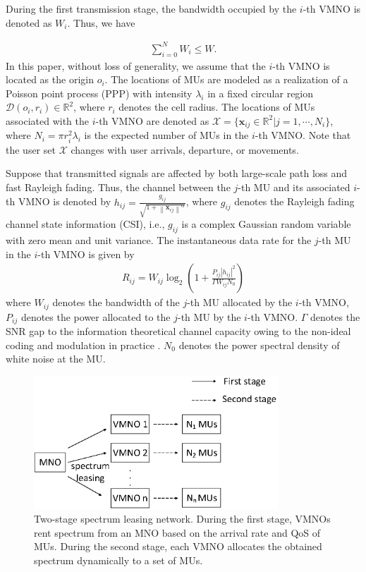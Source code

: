 \documentclass[journal]{IEEEtran}
\begin{document}
During the first transmission stage, the bandwidth occupied by the $i$-th VMNO is denoted as $W_i$. Thus, we have

\begin{align}
\sum_{i = 0}^{N} W_i \leq W.
\end{align}
In this paper, without loss of generality, we assume that the $i$-th VMNO is located as the origin $o_i$. The locations of MUs are modeled as a realization of a Poisson point process (PPP) with intensity $\lambda_i$ in a fixed circular region $\mathcal{D}(o_i, r_i) \in \mathbb{R}^2$, where $r_i$ denotes the cell radius. The locations of MUs associated with the $i$-th VMNO are denoted as $\mathcal{X} = \{\mathbf{x}_{ij} \in \mathbb{R}^2 | j = 1, \cdots, N_i\}$, where $N_i = \pi r_i^2 \lambda_i$ is the expected number of MUs in the $i$-th VMNO. Note that the user set $\mathcal{X}$ changes with user arrivals, departure, or movements.

Suppose that transmitted signals are affected by both large-scale path loss and fast Rayleigh fading. Thus, the channel between the $j$-th MU and its associated $i$-th VMNO is denoted by $h_{ij} = \frac{g_{ij}}{\sqrt{1 + {\left\| \mathbf{x}_{ij} \right\|}^\alpha}}$, where $g_{ij}$ denotes the Rayleigh fading channel state information (CSI), i.e., $g_{ij}$ is a complex Gaussian random variable with zero mean and unit variance. The instantaneous data rate for the $j$-th MU in the $i$-th VMNO is given by
\begin{align}
	R_{ij} = W_{ij}\log_2\left(1 + \frac{P_{ij} \left|h_{ij} \right|^2 }{\Gamma W_{ij}N_0}\right)
\end{align}
where $W_{ij}$ denotes the bandwidth of the $j$-th MU allocated by the $i$-th VMNO, $P_{ij}$ denotes the power allocated to the $j$-th MU by the $i$-th VMNO. $\Gamma$ denotes the SNR gap to the information theoretical channel capacity owing to the
non-ideal coding and modulation in practice \cite{JGDForney}. $N_0$ denotes the power spectral density of white noise at the MU.                      
\begin{figure}
	\centering
	\includegraphics[width=3.6in]{Pic1.eps}
	\caption{Two-stage spectrum leasing network. During the first stage, VMNOs rent spectrum from an MNO based on the arrival rate and QoS of MUs. During the second stage, each VMNO allocates the obtained spectrum dynamically to a set of MUs.}
\end{figure}
\end{document}
